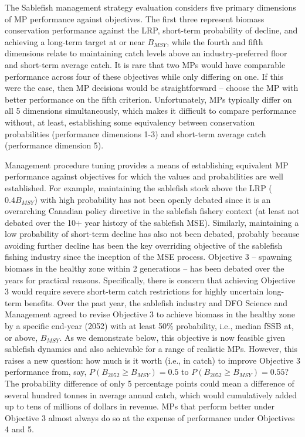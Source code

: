 \documentclass[11pt]{book}
\begin{document}
The Sablefish management strategy evaluation considers five primary dimensions of MP performance against objectives. The first three represent biomass conservation performance against the LRP, short-term probability of decline, and achieving a long-term target at or near \(B_{MSY}\), while the fourth and fifth dimensions relate to maintaining catch levels above an industry-preferred floor and short-term average catch. It is rare that two MPs would have comparable performance across four of these objectives while only differing on one. If this were the case, then MP decisions would be straightforward -- choose the MP with better performance on the fifth criterion. Unfortunately, MPs typically differ on all 5 dimensions simultaneously, which makes it difficult to compare performance without, at least, establishing some equivalency between conservation probabilities (performance dimensions 1-3) and short-term average catch (performance dimension 5).

Management procedure tuning provides a means of establishing equivalent MP performance against objectives for which the values and probabilities are well established. For example, maintaining the sablefish stock above the LRP (\(0.4B_{MSY}\)) with high probability has not been openly debated since it is an overarching Canadian policy directive in the sablefish fishery context (at least not debated over the 10+ year history of the sablefish MSE). Similarly, maintaining a low probability of short-term decline has also not been debated, probably because avoiding further decline has been the key overriding objective of the sablefish fishing industry since the inception of the MSE process. Objective 3 -- spawning biomass in the healthy zone within 2 generations -- has been debated over the years for practical reasons. Specifically, there is concern that achieving Objective 3 would require severe short-term catch restrictions for highly uncertain long-term benefits. Over the past year, the sablefish industry and DFO Science and Management agreed to revise Objective 3 to achieve biomass in the healthy zone by a specific end-year (2052) with at least 50\% probability, i.e., median fSSB at, or above, \(B_{MSY}\). As we demonstrate below, this objective is now feasible given sablefish dynamics and also achievable for a range of realistic MPs. However, this raises a new question: how much is it worth (i.e., in catch) to improve Objective 3 performance from, say, \(P(B_{2052} \geq B_{MSY}) = 0.5\) to \(P(B_{2052} \geq B_{MSY}) = 0.55\)? The probability difference of only 5 percentage points could mean a difference of several hundred tonnes in average annual catch, which would cumulatively added up to tens of millions of dollars in revenue. MPs that perform better under Objective 3 almost always do so at the expense of performance under Objectives 4 and 5.
\end{document}
